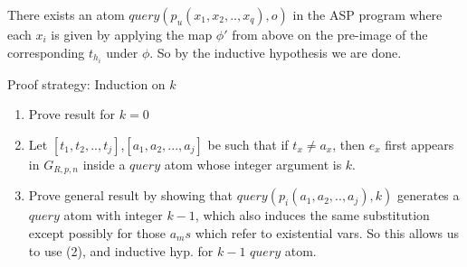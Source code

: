 \documentclass[sigconf]{acmart}
\begin{document}
There exists an atom $query(p_{u}(x_{1},x_{2},..,x_{q}),o)$ in the ASP program
where each $x_{i}$ is given by applying the map $\phi'$ from above on the
pre-image of the corresponding $t_{h_{i}}$ under $\phi$. So by the inductive
hypothesis we are done.


Proof strategy: Induction on $k$
\begin{enumerate}
    \item Prove result for $k =0 $
    \item Let $[t_{1},t_{2},..,t_{j}]$,$[a_{1},a_{2},...,a_{j}]$ be such that if $t_{x}\neq a_{x}$, then $e_{x}$ first appears in $G_{R,p,n}$ inside a $query$ atom whose integer argument is $k$.
    \item Prove general result by showing that $query(p_{i}(a_{1},a_{2},..,a_{j}),k)$ generates a $query$ atom with integer $k-1$, which also induces the same substitution except possibly for those $a_{m}s$ which refer to existential vars. So this allows us to use (2), and inductive hyp. for $k-1$ $query$ atom.
\end{enumerate}


%


\end{document}
